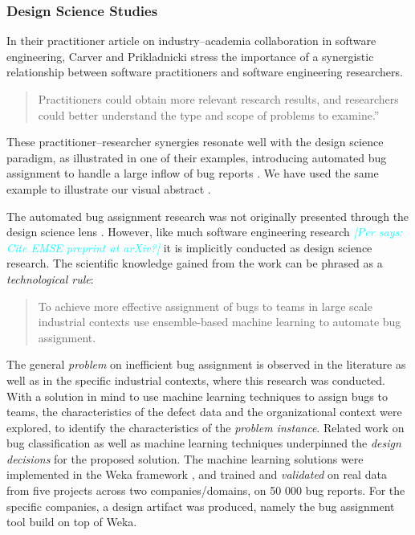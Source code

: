 \documentclass[graybox]{svmult}
\newcommand{\per}[1]{\textcolor{cyan}{{\it [Per says: #1]}}}
\newcommand{\per}[1]{}
\begin{document}
\subsubsection{Design Science Studies}
In their practitioner article on industry--academia collaboration in software engineering, Carver and Prikladnicki stress the importance of a synergistic relationship between software practitioners and software engineering researchers.
\begin{quote}Practitioners could obtain more relevant research results, and researchers could better understand the type and scope of problems to examine.'' \cite{CarverIEEESW2018}
\end{quote} 
These practitioner--researcher synergies resonate well with the design science paradigm, as illustrated in one of their examples, introducing automated bug assignment to handle a large inflow of bug reports \cite{JonssonBug15}. We have used the same example to illustrate our visual abstract \cite{StoreyESEM17}.

The automated bug assignment research was not originally presented through the design science lens \cite{JonssonBug15}. However, like much software engineering research \per{Cite EMSE preprint at arXiv?} it is implicitly conducted as design science research. 
The scientific knowledge gained from the work can be phrased as a \emph{technological rule}:
\begin{quote}{To achieve more effective assignment of bugs to teams in large scale industrial contexts use ensemble-based machine learning to automate bug assignment. \cite{StoreyESEM17}}\end{quote}

The general \emph{problem} on inefficient bug assignment is observed in the literature as well as in the specific industrial contexts, where this research was conducted. With a solution in mind to use machine learning techniques to assign bugs to teams, the characteristics of the defect data and the organizational context were explored, to identify the characteristics of the \emph{problem instance}. Related work on bug classification as well as machine learning techniques underpinned the \emph{design decisions} for the proposed solution. The machine learning solutions were implemented in the Weka framework \cite{hall_weka_2009}, and trained and \emph{validated} on real data from five projects across two companies/domains, on 50 000 bug reports. For the specific companies, a design artifact was produced, namely the bug assignment tool build on top of Weka.
\end{document}
